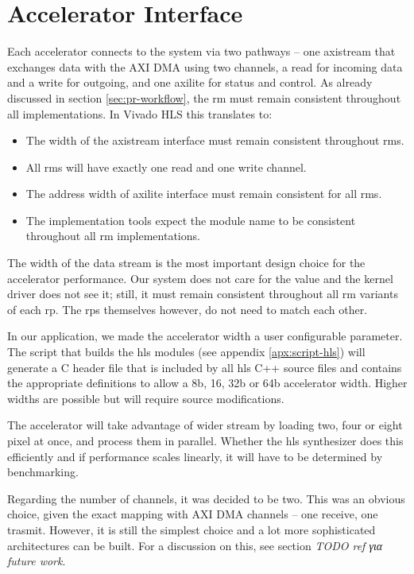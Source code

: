 \section{Accelerator Interface}
\label{sec:accelerator-interface}

Each accelerator connects to the system via two pathways -- one \gls{axistream} that 
exchanges data with the AXI DMA using two channels, a read for incoming data and
a write for outgoing, and one \gls{axilite} for status and control.
As already discussed in section \ref{sec:pr-workflow}, the \gls{rm} must remain
consistent throughout all implementations. In Vivado HLS this translates to:

\begin{itemize}
\item	The width of the \gls{axistream} interface must remain consistent throughout \glspl{rm}.
\item	All \glspl{rm} will have exactly one read and one write channel. 
\item	The address width of \gls{axilite} interface must remain consistent for all \glspl{rm}.
\item	The implementation tools expect the module name to be consistent throughout
	all \gls{rm} implementations.
\end{itemize}

The width of the data stream is the most important design choice for the accelerator performance.
Our system does not care for the value and the kernel driver does not see it; still,
it must remain consistent throughout all \gls{rm} variants of each \gls{rp}. The \glspl{rp} themselves
however, do not need to match each other.

In our application, we made the accelerator width a user configurable parameter. 
The script that builds the \gls{hls} modules (see appendix \ref{apx:script-hls}) 
will generate a C header file that is included by all \gls{hls} C++ source files
and contains the appropriate definitions to allow a 8b, 16, 32b or 64b accelerator width.
Higher widths are possible but will require source modifications.

The accelerator will take advantage of wider stream by loading two, four or eight pixel at once,
and process them in parallel. Whether the \gls{hls} synthesizer does this efficiently and 
if performance scales linearly, it will have to be determined by benchmarking.

Regarding the number of channels, it was decided to be two. This was an obvious choice,
given the exact mapping with AXI DMA channels -- one receive, one trasmit. 
However, it is still the simplest choice and a lot more sophisticated architectures
can be built. For a discussion on this, see section \emph{TODO ref για future work}.

